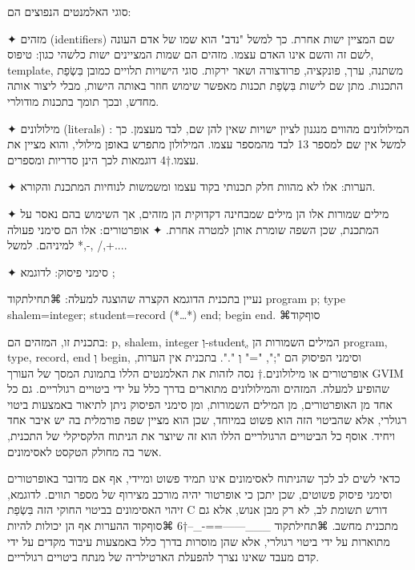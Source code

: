 סוגי האלמנטים הנפוצים הם:
\begin{enumerate}
✦ מזהים (identifiers) שם המציין ישות אחרת. כך למשל "נדב" הוא שמו של אדם העונה
לשם זה והשם אינו האדם עצמו. מזהים הם שמות המציינים ישות כלשהי כגון: טיפוס,
template, משתנה, ערך, פונקציה, פרודצורה ושאר ירקות. סוגי הישויות תלויים כמובן
בִּשְׂפַת התכנות.  מתן שם לישות בִּשְׂפַת תכנות מאפשר שימוש חוזר באותה הישות, מבלי ליצור
אותה מחדש, ובכך תומך בתכנות מודולרי.

✦ מילולונים (literals) : המילולונים מהווים מנגנון לציון ישויות שאין להן שם, לבד
מעצמן. כך למשל אין שם למספר 13 לבד מהמספר עצמו. המילולון מתפרש באופן מילולי,
והוא מציין את עצמו.†{4} דוגמאות לכך הינן סדריות ומספרים.

✦ הערות: אלו לא מהוות חלק תכנותי בקוד עצמו ומשמשות לנוחיות המתכנת והקורא.

✦ מילים שמורות אלו הן מילים שמבחינה דקדוקית הן מזהים, אך השימוש בהם נאסר על
המתכנת, שכן השפה שומרת אותן למטרה אחרת.  ✦ אופרטורים: אלו הם סימני פעולה
למיניהם. למשל *,-, /,+....

✦ סימני פיסוק: לדוגמא ;
\end{enumerate}

נעיין בתכנית הדוגמא הקצרה שהוצגה למעלה:
⌘תחילת{קוד}
program p;
type
shalem=integer;
student=record (*…*) end;
begin
end.
⌘סוף{קוד}

בתכנית זו, המזהים הם: p, shalem, integer וְ-studentְ, המילים השמורות הן program,
type, record, end וְ begin, וסימני הפיסוק הם ";", "=" וְ ".". בתכנית אין הערות,
אופרטורים או מילולונים.†{ נסה לזהות את האלמנטים הללו בתמונת המסך של העורך GVIM
שהופיע למעלה.} המזהים והמילולונים מתוארים בדרך כלל על ידי ביטויים רגולריים. גם
כל אחד מן האופרטורים, מן המילים השמורות, ומן סימני הפיסוק ניתן לתיאור באמצעות
ביטוי רגולרי, אלא שהביטוי הזה הוא פשוט במיוחד, שכן הוא מציין שפה פורמלית בה יש
איבר אחד ויחיד. אוסף כל הביטויים הרגולריים הללו הוא זה שיוצר את הניתוח הלקסיקלי
של התכנית, אשר בה מחולק הטקסט לאסימונים.

כדאי לשים לב לכך שהניתוח לאסימונים אינו תמיד פשוט ומיידי, אף אם מדובר
באופרטורים וסימני פיסוק פשוטים, שכן יתכן כי אופרטור יהיה מורכב מצירוף של מספר
תווים. לדוגמא, זיהוי האסימונים בביטוי החוקי הזה בִּשְׂפַת C דורש תשומת לב, לא רק מבן
אנוש, אלא גם מתכנית מחשב.  
⌘תחילת{קוד}
\_\_\_------==-\_--†{6}
⌘סוף{קוד}
ההערות אף הן יכולות להיות מתוארות על ידי ביטוי רגולרי, אלא שהן מוסרות בדרך כלל
באמצעות עיבוד מקדים על ידי קדם מעבד שאינו נצרך להפעלת הארטילריה של מנתח ביטויים
רגולריים.
      
